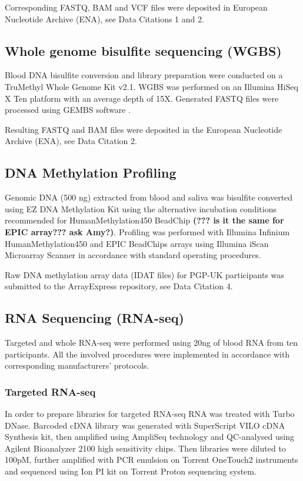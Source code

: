 \documentclass[english]{article}
\begin{document}
Corresponding FASTQ, BAM and VCF files were deposited in European Nucleotide Archive (ENA), see Data Citations 1 and 2.

\subsection*{Whole genome bisulfite sequencing (WGBS)}
Blood DNA bisulfite conversion and library preparation were conducted on a TruMethyl Whole Genome Kit v2.1. WGBS was performed on an Illumina HiSeq X Ten platform with an average depth of 15X. Generated FASTQ files were processed using GEMBS software \cite{gembs_bioinformatics}.

Resulting FASTQ and BAM files were deposited in the European Nucleotide Archive (ENA), see Data Citation 2.

\subsection*{DNA Methylation Profiling}
Genomic DNA (500 ng) extracted from blood and saliva was bisulfite converted using EZ DNA Methylation Kit using the alternative incubation conditions recommended for HumanMethylation450 BeadChip \textbf{(??? is it the same for EPIC array??? ask Amy?)}. Profiling was performed with Illumina Infinium HumanMethylation450 and EPIC BeadChips arrays using Illumina iScan Microarray Scanner in accordance with standard operating procedures.

Raw DNA methylation array data (IDAT files) for PGP-UK participants was submitted to the ArrayExpress repository, see Data Citation 4.

\subsection*{RNA Sequencing (RNA-seq)}
Targeted and whole RNA-seq were performed using 20ng of blood RNA from ten participants. All the involved procedures were implemented in accordance with corresponding manufacturers' protocols.
\subsubsection*{Targeted RNA-seq}
In order to prepare libraries for targeted RNA-seq RNA was treated with Turbo DNase. Barcoded cDNA library was generated with SuperScript VILO cDNA Synthesis kit, then amplified using AmpliSeq technology and QC-analysed using Agilent Bioanalyzer 2100 high sensitivity chips. Then libraries were diluted to 100pM, further amplified with PCR emulsion on Torrent OneTouch2 instruments and sequenced using Ion PI kit on Torrent Proton sequencing system.
\end{document}
